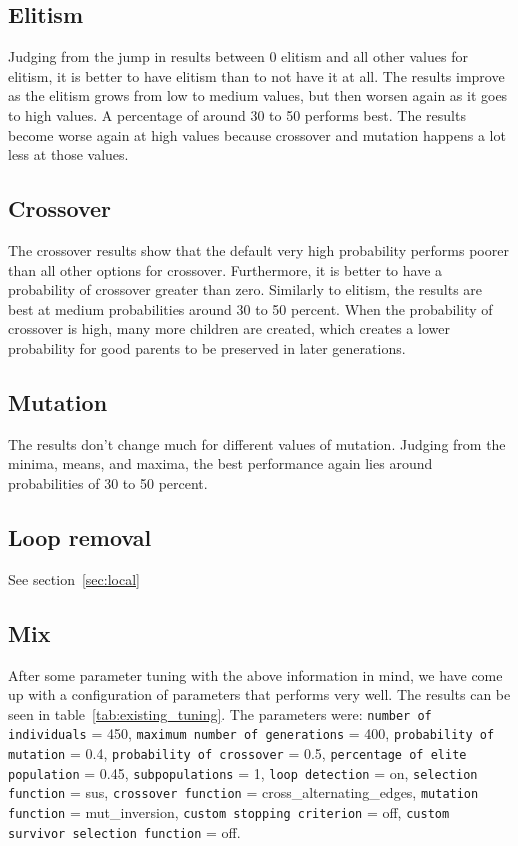\documentclass{report}
\begin{document}
\subsection{Elitism}
Judging from the jump in results between 0 elitism and all other values for elitism, it is better to have elitism than to not have it at all. The results improve as the elitism grows from low to medium values, but then worsen again as it goes to high values. A percentage of around 30 to 50 performs best. The results become worse again at high values because crossover and mutation happens a lot less at those values.

\subsection{Crossover}
The crossover results show that the default very high probability performs poorer than all other options for crossover. Furthermore, it is better to have a probability of crossover greater than zero. Similarly to elitism, the results are best at medium probabilities around 30 to 50 percent. When the probability of crossover is high, many more children are created, which creates a lower probability for good parents to be preserved in later generations.

\subsection{Mutation}
The results don't change much for different values of mutation. Judging from the minima, means, and maxima, the best performance again lies around probabilities of 30 to 50 percent.

\subsection{Loop removal}
See section~\ref{sec:local}

\subsection{Mix}
After some parameter tuning with the above information in mind, we have come up with a configuration of parameters that performs very well. The results can be seen in table~\ref{tab:existing_tuning}. The parameters were: \texttt{number of individuals} = 450, \texttt{maximum number of generations} = 400, \texttt{probability of mutation} = 0.4, \texttt{probability of crossover} = 0.5, \texttt{percentage of elite population} = 0.45, \texttt{subpopulations} = 1, \texttt{loop detection} = on, \texttt{selection function} = sus, \texttt{crossover function} = cross\_alternating\_edges, \texttt{mutation function} = mut\_inversion, \texttt{custom stopping criterion} = off, \texttt{custom survivor selection function} = off.

\end{document}

